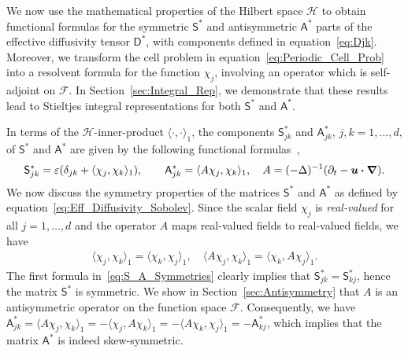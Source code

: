 \documentclass[leqno,onefignum,onetabnum]{siamltex1213}
\newcommand{\secref}[1]{Section~\ref{#1}}
\newcommand{\Dm}{\mathsf{D}}
\newcommand{\Sm}{\mathsf{S}}
\newcommand{\Am}{\mathsf{A}}
\newcommand{\Hs}{\mathscr{H}}
\newcommand{\Fs}{\mathscr{F}}
\newcommand\bnabla{\mbox{\boldmath${\nabla}$}}
\providecommand\bcdot{\boldsymbol{\cdot}}
\newcommand{\vecu}{\boldsymbol{u}}
\begin{document}
We now use the mathematical properties of the Hilbert space $\Hs$ to
obtain functional formulas for the symmetric $\Sm^*$ and
antisymmetric $\Am^*$ parts of the effective diffusivity tensor
$\Dm^*$, with components defined in
equation~\eqref{eq:Djk}. Moreover, we transform the cell problem in 
equation~\eqref{eq:Periodic_Cell_Prob} into a resolvent formula for
the function $\chi_j$, involving an operator which is self-adjoint on
$\Fs$. In \secref{sec:Integral_Rep}, we demonstrate that these results
lead to Stieltjes integral representations for both $\Sm^*$ and $\Am^*$. 



In terms of the $\Hs$-inner-product $\langle\cdot,\cdot\rangle_1$, the components
$\Sm^*_{jk}$ and $\Am^*_{jk}$, $j,k=1,\ldots,d$, of $\Sm^*$ and $\Am^*$ are
given by the following functional
formulas~\cite{Pavliotis:PHD_Thesis},     
%
\begin{align}\label{eq:Eff_Diffusivity_Sobolev}
  \Sm^*_{jk}=\varepsilon(\delta_{jk}+\langle\chi_j,\chi_k\rangle_1), \qquad
  \Am^*_{jk}=\langle A\chi_j,\chi_k\rangle_1, \quad
  A=(-\Delta)^{-1}(\partial_t-\vecu \bcdot\bnabla).
\end{align}
%
We now discuss the symmetry properties of the matrices $\Sm^*$ and
$\Am^*$ as defined by equation~\eqref{eq:Eff_Diffusivity_Sobolev}.
Since the scalar field $\chi_j$ is \emph{real-valued} for all $j=1,\ldots,d$
and the operator $A$ maps real-valued fields to real-valued
fields, we have  
%
\begin{align} \label{eq:S_A_Symmetries}
  \langle\chi_j,\chi_k\rangle_1=\langle\chi_k,\chi_j\rangle_1, \quad
  \langle A\chi_j,\chi_k\rangle_1=\langle \chi_k,A\chi_j\rangle_1.
\end{align}
%
The first formula in~\eqref{eq:S_A_Symmetries} clearly implies that
$\Sm^*_{jk}=\Sm^*_{kj}$, hence the matrix $\Sm^*$ is 
symmetric. We show in \secref{sec:Antisymmetry} that $A$ is an
antisymmetric operator on the function space $\Fs$.  Consequently, we have
$\Am^*_{jk}=\langle A\chi_j,\chi_k\rangle_1=-\langle\chi_j,A\chi_k\rangle_1=-\langle A\chi_k,\chi_j\rangle_1=-\Am^*_{kj}$,
which implies that the matrix $\Am^*$ is indeed skew-symmetric.  



 
\end{document}
